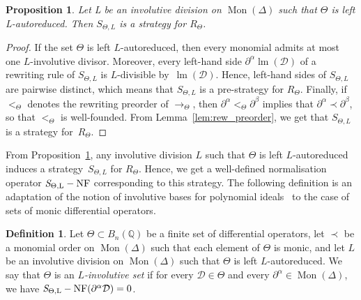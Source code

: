 \documentclass[11pt]{article}
\newtheorem{proposition}[theorem]{Proposition}
\theoremstyle{definition}
\newtheorem{definition}[theorem]{Definition}
\newcommand\D{\mathcal{D}}
\DeclareMathOperator{\lm}{lm}
\newcommand\Q{\mathbb{Q}}
\newcommand\Weyl[1]{B_{#1}(\Q)}
\newcommand\monBasis{\Mon(\Delta)}
\DeclareMathOperator{\Mon}{Mon}
\newcommand\rewTheta{\to_\Theta}
\newcommand\RTheta{R_{\Theta}}
\newcommand\SThetaL{S_{\Theta,L}}
\DeclareMathOperator{\SThetaLNF}{{\it S}_{\Theta,L}-NF}
\begin{document}
\begin{proposition}\label{prop:involutive_strategy}
  Let L be an involutive division on $\Mon(\Delta)$ such that $\Theta$ is
  left L-autoreduced. Then $\SThetaL$ is a strategy for $\RTheta$.  
\end{proposition}

\begin{proof}
  If the set $\Theta$ is left $L$-autoreduced, then every monomial admits
  at most one $L$-involutive divisor. Moreover, every left-hand side
  $\partial^\alpha\lm(\D)$ of a rewriting rule of $\SThetaL$ is
  $L$-divisible by~$\lm(\D)$. Hence, left-hand sides of $\SThetaL$ are
  pairwise distinct, which means that $\SThetaL$ is a pre-strategy for
  $\RTheta$. Finally, if $<_\Theta$ denotes the rewriting preorder of
  $\rewTheta$, then $\partial^\alpha<_\Theta\partial^\beta$ implies that
  $\partial^\alpha\prec\partial^\beta$, so that $<_\Theta$ is
  well-founded. From Lemma~\ref{lem:rew_preorder}, we get that $\SThetaL$
  is a strategy for~$\RTheta$. 
\end{proof}
\smallskip

From Proposition~\ref{prop:involutive_strategy}, any involutive division
$L$ such that $\Theta$ is left $L$-autoreduced induces a 
strategy~$\SThetaL$ for $\RTheta$. Hence, we get a well-defined
normalisation operator $\SThetaLNF$ corresponding to this strategy. The
following definition is an adaptation of the notion of involutive bases
for polynomial ideals~\cite{MR1627129} to the case of sets of monic
differential operators.
\smallskip

\begin{definition}
  Let $\Theta\subset\Weyl{n}$ be a finite set of differential operators,
  let $\prec$ be a monomial order on $\monBasis$ such that each element
  of $\Theta$ is monic, and let $L$ be an involutive division on
  $\Mon(\Delta)$ such that $\Theta$ is left $L$-autoreduced. We say that
  $\Theta$ is an {\em $L$-involutive set} if for every $\D\in\Theta$ and every
  $\partial^\alpha\in\Mon(\Delta)$, we have
  $\SThetaLNF(\partial^\alpha\D)=0$. 
\end{definition}
\smallskip
\end{document}

